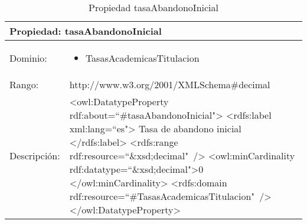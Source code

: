 \begin{table}[!ht]
	\centering
	\begin{tabular}{|p{}|p{}|}
		\hline
		\multicolumn{2}{|l|}{Propiedad: \textbf{tasaAbandonoInicial}}
		\\ \hline
		Dominio:&
		\begin{itemize}
			\item TasasAcademicasTitulacion
		\end{itemize}
		\\ \hline
		Rango:&
		http://www.w3.org/2001/XMLSchema\#decimal
		\\ \hline
		Descripción:&
		\textless owl:DatatypeProperty rdf:about=``\#tasaAbandonoInicial"\textgreater\newline 
		\tab\textless rdfs:label xml:lang=``es"\textgreater\newline
		\tab\tab Tasa de abandono inicial\newline
		\tab\textless /rdfs:label\textgreater\newline
		\tab\textless rdfs:range\newline
		\tab\tab rdf:resource=``\&xsd;decimal"\ /\textgreater\newline
		\tab\textless owl:minCardinality \newline
		\tab\tab rdf:datatype=``\&xsd;decimal"\textgreater0\newline
		\tab\textless /owl:minCardinality\textgreater\newline
		\tab\textless rdfs:domain\newline
		\tab\tab rdf:resource=``\#TasasAcademicasTitulacion"\ /\textgreater\newline
		\textless /owl:DatatypeProperty\textgreater
		\\ \hline
	\end{tabular}
	\caption{Propiedad tasaAbandonoInicial}
	\label{propiedad-tasaabandonoinicial}
\end{table}

